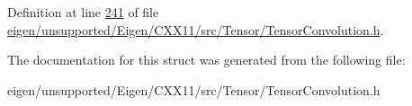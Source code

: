 Definition at line \hyperlink{eigen_2unsupported_2_eigen_2_c_x_x11_2src_2_tensor_2_tensor_convolution_8h_source_l00241}{241} of file \hyperlink{eigen_2unsupported_2_eigen_2_c_x_x11_2src_2_tensor_2_tensor_convolution_8h_source}{eigen/unsupported/\+Eigen/\+C\+X\+X11/src/\+Tensor/\+Tensor\+Convolution.\+h}.



The documentation for this struct was generated from the following file\+:\begin{DoxyCompactItemize}
\item 
eigen/unsupported/\+Eigen/\+C\+X\+X11/src/\+Tensor/\+Tensor\+Convolution.\+h\end{DoxyCompactItemize}
